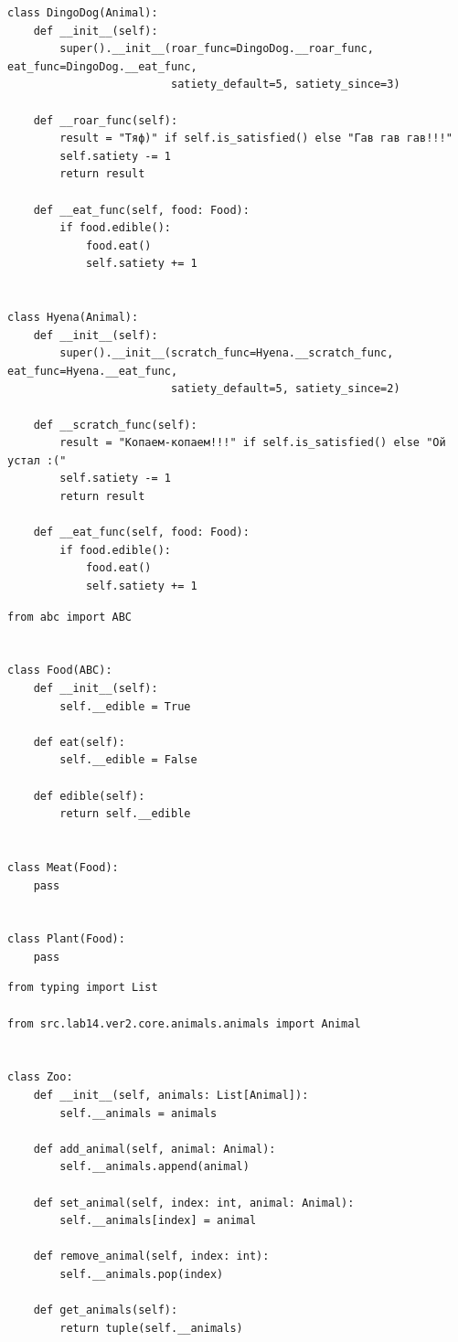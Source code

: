 \documentclass[a4paper,14pt]{extarticle}
\begin{document}
\begin{verbatim}
class DingoDog(Animal):
    def __init__(self):
        super().__init__(roar_func=DingoDog.__roar_func, eat_func=DingoDog.__eat_func,
                         satiety_default=5, satiety_since=3)

    def __roar_func(self):
        result = "Тяф)" if self.is_satisfied() else "Гав гав гав!!!"
        self.satiety -= 1
        return result

    def __eat_func(self, food: Food):
        if food.edible():
            food.eat()
            self.satiety += 1


class Hyena(Animal):
    def __init__(self):
        super().__init__(scratch_func=Hyena.__scratch_func, eat_func=Hyena.__eat_func,
                         satiety_default=5, satiety_since=2)

    def __scratch_func(self):
        result = "Копаем-копаем!!!" if self.is_satisfied() else "Ой устал :("
        self.satiety -= 1
        return result

    def __eat_func(self, food: Food):
        if food.edible():
            food.eat()
            self.satiety += 1

\end{verbatim}
\begin{verbatim}
from abc import ABC


class Food(ABC):
    def __init__(self):
        self.__edible = True

    def eat(self):
        self.__edible = False

    def edible(self):
        return self.__edible


class Meat(Food):
    pass


class Plant(Food):
    pass

\end{verbatim}
\begin{verbatim}
from typing import List

from src.lab14.ver2.core.animals.animals import Animal


class Zoo:
    def __init__(self, animals: List[Animal]):
        self.__animals = animals

    def add_animal(self, animal: Animal):
        self.__animals.append(animal)

    def set_animal(self, index: int, animal: Animal):
        self.__animals[index] = animal

    def remove_animal(self, index: int):
        self.__animals.pop(index)

    def get_animals(self):
        return tuple(self.__animals)

\end{verbatim}
\end{document}
